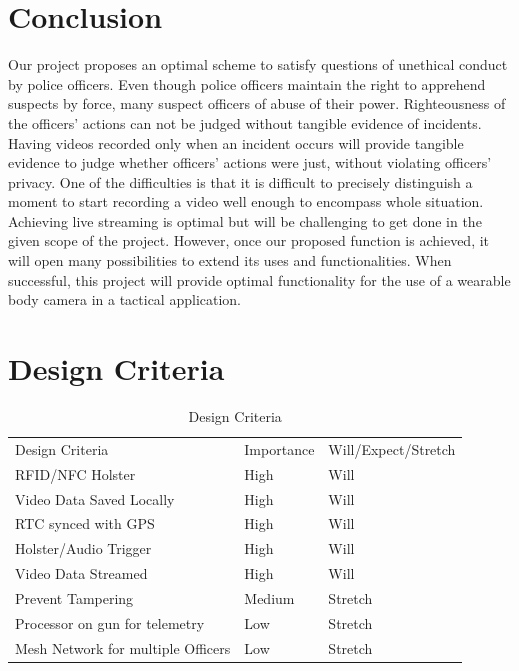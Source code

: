 \documentclass[12pt]{article}
\begin{document}
\section{Conclusion}

Our project proposes an optimal scheme to satisfy questions of unethical
conduct by police officers. Even though police officers maintain the right to
apprehend suspects by force, many suspect officers of abuse of their power.
Righteousness of the officers’ actions can not be judged without tangible
evidence of incidents. Having videos recorded only when an incident occurs will
provide tangible evidence to judge whether officers’ actions were just, without
violating officers’ privacy. One of the difficulties is that it is difficult to
precisely distinguish a moment to start recording a video well enough to
encompass whole situation. Achieving live streaming is optimal but will be
challenging to get done in the given scope of the project. However, once our
proposed function is achieved, it will open many possibilities to extend its
uses and functionalities. When successful, this project will provide optimal
functionality for the use of a wearable body camera in a tactical application. 

\newpage




\newpage

\appendix
\section{Design Criteria}

\begin{table}[h!]
    \centering
    \caption{Design Criteria}
    \begin{tabular}{lll}
        Design Criteria & Importance & Will/Expect/Stretch\\
        RFID/NFC Holster & High & Will\\
        Video Data Saved Locally & High & Will\\
        RTC synced with GPS & High & Will\\
        Holster/Audio Trigger & High & Will\\
        Video Data Streamed & High & Will\\
        Prevent Tampering & Medium & Stretch\\
        Processor on gun for telemetry & Low & Stretch\\
        Mesh Network for multiple Officers & Low & Stretch\\
    \end{tabular}
\end{table}
\end{document}
